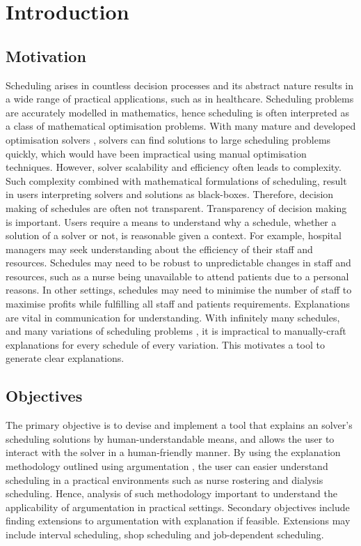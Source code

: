 \chapter{Introduction}
	
\section{Motivation}

Scheduling arises in countless decision processes and its abstract nature results in a wide range of practical applications, such as in healthcare.\cite{sanr} Scheduling problems are accurately modelled in mathematics, hence scheduling is often interpreted as a class of mathematical optimisation problems. With many mature and developed optimisation solvers \cite{clp}, solvers can find solutions to large scheduling problems quickly, which would have been impractical using manual optimisation techniques. However, solver scalability and efficiency often leads to complexity. Such complexity combined with mathematical formulations of scheduling, result in users interpreting solvers and solutions as black-boxes. Therefore, decision making of schedules are often not transparent.
\linespace
Transparency of decision making is important. Users require a means to understand why a schedule, whether a solution of a solver or not, is reasonable given a context. For example, hospital managers may seek understanding about the efficiency of their staff and resources. Schedules may need to be robust to unpredictable changes in staff and resources, such as a nurse being unavailable to attend patients due to a personal reasons. In other settings, schedules may need to minimise the number of staff to maximise profits while fulfilling all staff and patients requirements.
\linespace
Explanations are vital in communication for understanding. With infinitely many schedules, and many variations of scheduling problems \cite{sta}, it is impractical to manually-craft explanations for every schedule of every variation. This motivates a tool to generate clear explanations.

\section{Objectives}

The primary objective is to devise and implement a tool that explains an solver's scheduling solutions by human-understandable means, and allows the user to interact with the solver in a human-friendly manner. By using the explanation methodology outlined using argumentation \cite{aes}, the user can easier understand scheduling in a practical environments such as nurse rostering and dialysis scheduling. Hence, analysis of such methodology important to understand the applicability of argumentation in practical settings.
\linespace
Secondary objectives include finding extensions to argumentation with explanation if feasible. Extensions may include interval scheduling, shop scheduling and job-dependent scheduling.

